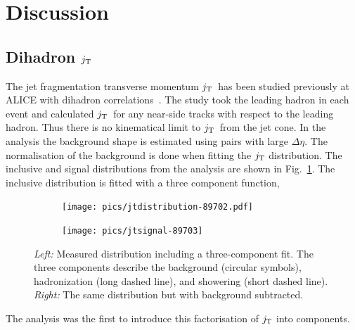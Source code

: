 
\section{Discussion}
\label{sec:disc}
\cite{Chatrchyan:2014gia,Dasgupta:2007wa}

\subsection{Dihadron $\jt{}$}
The jet fragmentation transverse momentum $\jt{}$ has been studied previously at ALICE with dihadron correlations~\cite{ALICEjt}. The study took the leading hadron in each event and calculated $\jt{}$ for any near-side tracks with respect to the leading hadron. Thus there is no kinematical limit to $\jt{}$ from the jet cone. In the analysis the background shape is estimated using pairs with large $\Delta \eta$. The normalisation of the background is done when fitting the $\jt{}$ distribution. The inclusive and signal distributions from the analysis are shown in Fig.~\ref{fig:dihadron}. The inclusive distribution is fitted with a three component function, 

\begin{figure}[htp]
\centering
\begin{subfigure}{0.49\textwidth}
\texttt{[image: pics/jtdistribution-89702.pdf]}
\end{subfigure}
\begin{subfigure}{0.49\textwidth}
\texttt{[image: pics/jtsignal-89703]}
\end{subfigure}
\caption[Dihadron $\jt{}$ results]{\emph{Left:} Measured \jt distribution including a three-component fit. The three components describe the background (circular symbols), hadronization (long dashed line), and showering (short dashed line). \emph{Right:} The same \jt distribution but with background subtracted.}
\label{fig:dihadron}
\end{figure}



The analysis was the first to introduce this factorisation of $\jt{}$ into components.

